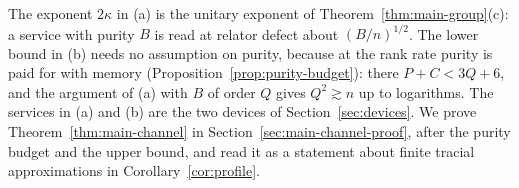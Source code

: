

The exponent $2\kappa$ in (a) is the unitary exponent of Theorem~\ref{thm:main-group}(c): a service with purity $B$ is read at relator defect about
$(B/n)^{1/2}$. The lower bound in (b) needs no assumption on purity, because at the rank rate purity is paid for with memory
(Proposition~\ref{prop:purity-budget}): there $P+C<3Q+6$, and the argument of (a) with $B$ of order $Q$ gives $Q^2\gtrsim n$ up to logarithms. The
services in (a) and (b) are the two devices of Section~\ref{sec:devices}. We prove Theorem~\ref{thm:main-channel} in
Section~\ref{sec:main-channel-proof}, after the purity budget and the upper bound, and read it as a statement about finite tracial
approximations in Corollary~\ref{cor:profile}.
